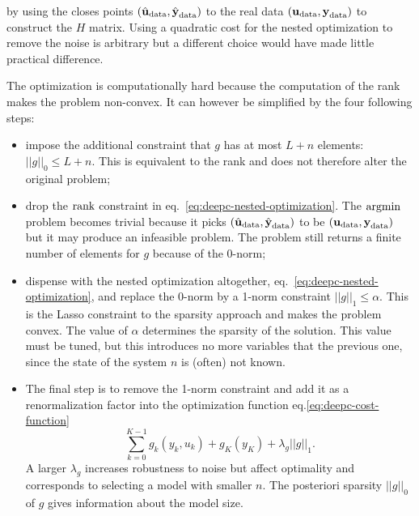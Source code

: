 by using the closes points $(\hat{\boldsymbol{\mathrm{u}}}_\textrm{data},\hat{\boldsymbol{\mathrm{y}}}_\textrm{data})$ to the real data $(\boldsymbol{\mathrm{u}}_\textrm{data},\boldsymbol{\mathrm{y}}_\textrm{data})$ to construct the $H$ matrix. Using a quadratic cost for the nested optimization to remove the noise is arbitrary but a different choice would have made little practical difference.

The optimization is computationally hard because the computation of the rank makes the problem non-convex. It can however be simplified by the four following steps:
\begin{itemize}
\item impose the additional constraint that $g$ has at most $L+n$ elements: $||g||_0\le L+n$. This is equivalent to the rank and does not therefore alter the original problem;
\item drop the $\textrm{rank}$ constraint in eq.~\eqref{eq:deepc-nested-optimization}. The $\textrm{argmin}$ problem becomes trivial because it picks $(\hat{\boldsymbol{\mathrm{u}}}_\textrm{data},\hat{\boldsymbol{\mathrm{y}}}_\textrm{data})$ to be $(\boldsymbol{\mathrm{u}}_\textrm{data},\boldsymbol{\mathrm{y}}_\textrm{data})$ but it may produce an infeasible problem. The problem still returns a finite number of elements for $g$ because of the 0-norm;
\item dispense with the nested optimization altogether, eq.~\eqref{eq:deepc-nested-optimization}, and replace the 0-norm by a 1-norm constraint $||g||_1\le \alpha$. This is the Lasso constraint to the sparsity approach and makes the problem convex. The value of $\alpha$ determines the sparsity of the solution. This value must be tuned, but this introduces no more variables that the previous one, since the state of the system $n$ is (often) not known.
\item The final step is to remove the 1-norm constraint and add it as a renormalization factor into the optimization function eq.\eqref{eq:deepc-cost-function}
  \begin{equation*}
    \sum_{k=0}^{K-1} g_k(y_k,u_k) + g_K(y_K) + \lambda_g||g||_1.
  \end{equation*}
  A larger $\lambda_g$ increases robustness to noise but affect optimality and corresponds to selecting a model with smaller $n$. The posteriori sparsity $||g||_0$ of $g$ gives information about the model size.
\end{itemize}


